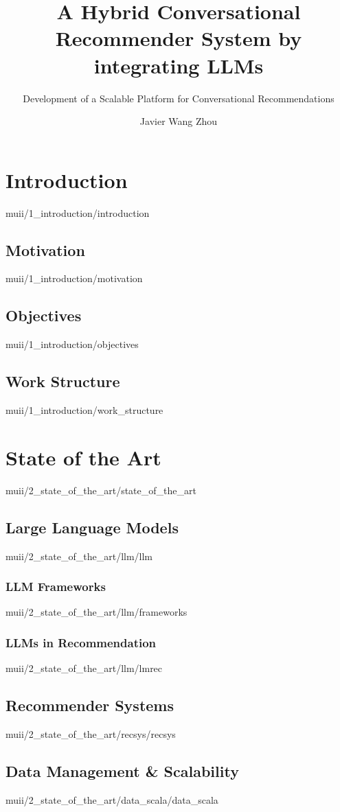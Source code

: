 \documentclass[english,epsbased,copyright,final,printable,covers,extendedindex,firstnumbered,tfm,gnuplot,loc,loe,lof,lot]{tfgtfmthesisuam}
\title{A Hybrid Conversational Recommender System by integrating LLMs}
\subtitle{Development of a Scalable Platform for Conversational Recommendations}
\author{Javier Wang Zhou}
\begin{document}
  \chapter{Introduction\label{CAP:INTRODUCTION}}{muii/1_introduction/introduction}
    \section{Motivation\label{SEC:MOTIVATION}}{muii/1_introduction/motivation}
    \section{Objectives\label{SEC:GOALS}}{muii/1_introduction/objectives}
    \section{Work Structure\label{SEC:WORK_STRUCT}}{muii/1_introduction/work_structure}
  \chapter{State of the Art\label{CAP:STATE_OF_THE_ART}}{muii/2_state_of_the_art/state_of_the_art}
    \section{Large Language Models\label{SEC:LLM}}{muii/2_state_of_the_art/llm/llm}
      \subsection{LLM Frameworks\label{SS:LLMFRAMEWORKS}}{muii/2_state_of_the_art/llm/frameworks}
      \subsection{LLMs in Recommendation\label{SEC:LMREC}}{muii/2_state_of_the_art/llm/lmrec}

    \section{Recommender Systems\label{SEC:RECSYS}}{muii/2_state_of_the_art/recsys/recsys}

    \section{Data Management \& Scalability\label{SEC:DATA_SCALA}}{muii/2_state_of_the_art/data_scala/data_scala}
\end{document}
